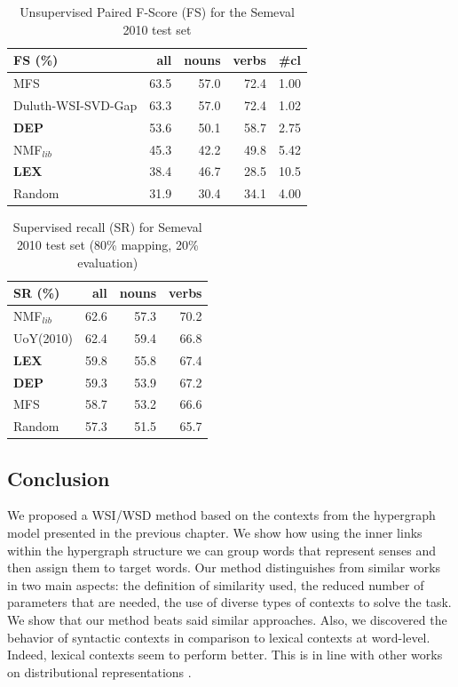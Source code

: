 \begin{table}[]
\centering

\begin{tabular}{@{}lrrrr@{}}
\toprule
\textbf{FS (\%)} & \textbf{all} & \textbf{nouns} & \textbf{verbs} & \textbf{\#cl} \\ \midrule
MFS & 63.5 & 57.0 & 72.4 & 1.00 \\
Duluth-WSI-SVD-Gap & 63.3 & 57.0 & 72.4 & 1.02 \\
\textbf{DEP} & 53.6 & 50.1 & 58.7 & 2.75 \\
NMF$_{lib}$&45.3&42.2&49.8&5.42\\
\textbf{LEX} & 38.4 & 46.7 & 28.5 & 10.5 \\
Random & 31.9 & 30.4 & 34.1 & 4.00 \\ \bottomrule
\end{tabular}
\caption{Unsupervised Paired F-Score (FS) for the Semeval 2010 test set}
\label{tab:sem2010_FS}
\end{table}


\begin{table}[h!]
\centering

\begin{tabular}{@{}lrrr@{}}
\toprule
\textbf{SR (\%)} & \textbf{all} & \textbf{nouns} & \textbf{verbs} \\ \midrule
NMF$_{lib}$&62.6&57.3&70.2\\
UoY(2010) & 62.4 & 59.4 & 66.8 \\

\textbf{LEX} & 59.8 & 55.8 & 67.4 \\
\textbf{DEP} & 59.3 & 53.9 & 67.2 \\
MFS & 58.7 & 53.2 & 66.6 \\
Random & 57.3 & 51.5 & 65.7 \\ \bottomrule

\end{tabular}

\caption{Supervised recall (SR) for Semeval 2010 test set (80\% mapping, 20\% evaluation)}
\label{tab:sem2010_SR}
\end{table}


\subsection{Conclusion}
We proposed a WSI/WSD method based on the contexts from the hypergraph model presented in the previous chapter. We show how using the inner links within the hypergraph structure we can group words that represent senses and then assign them to target words. Our method distinguishes from similar works in two main aspects: the definition of similarity used, the reduced number of parameters that are needed, the use of diverse types of contexts to solve the task. 	We show that our method beats said similar approaches. Also, we discovered the behavior of syntactic contexts in comparison to lexical contexts at word-level. Indeed, lexical contexts seem to perform better. This is in line with other works on distributional representations \cite{kiela2014systematic}.



